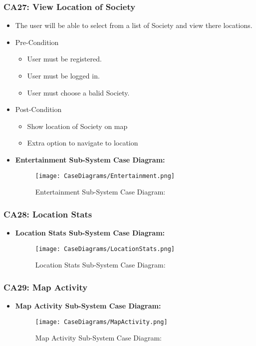 \documentclass[12pt,a4paper]{article}
\begin{document}
		\subsubsection{CA27: View Location of Society}
				\begin{itemize}
				\item The user will be able to select from a list of Society and view there locations.
					\item Pre-Condition
						\begin{itemize}
							\item User must be registered.
							\item User must be logged in.
							\item User must choose a balid Society.
						\end{itemize}
					\item Post-Condition
						\begin{itemize}
							\item Show location of Society on map
							\item Extra option to navigate to location
						\end{itemize}
				\end{itemize}
			\begin{itemize}
				\item \textbf{Entertainment Sub-System Case Diagram:}
				\begin{figure}[H]
					\texttt{[image: CaseDiagrams/Entertainment.png]}
					\caption{Entertainment Sub-System Case Diagram:}
				\end{figure}
			\end{itemize}
		\subsubsection{CA28: Location Stats}
			\begin{itemize}
				\item \textbf{Location Stats Sub-System Case Diagram:}
				\begin{figure}[H]
					\texttt{[image: CaseDiagrams/LocationStats.png]}
					\caption{Location Stats Sub-System Case Diagram:}
				\end{figure}
			\end{itemize}
		\subsubsection{CA29: Map Activity}
			\begin{itemize}
				\item \textbf{Map Activity Sub-System Case Diagram:}
				\begin{figure}[H]
					\texttt{[image: CaseDiagrams/MapActivity.png]}
					\caption{Map Activity Sub-System Case Diagram:}
				\end{figure}
			\end{itemize}
\end{document}
